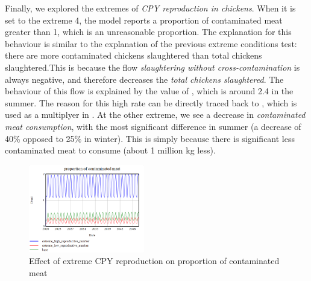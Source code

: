 Finally, we explored the extremes of \textit{CPY reproduction in chickens}. When it is set to the extreme 4, the model reports a proportion of contaminated meat greater than 1, which is an unreasonable proportion. The explanation for this behaviour is similar to the explanation of the previous extreme conditions test: there are more contaminated chickens slaughtered than total chickens slaughtered.This is because the flow \textit{slaughtering without cross-contamination} is always negative, and therefore decreases the \textit{total chickens slaughtered}. The behaviour of this flow is explained by the value of , which is around 2.4 in the summer. The reason for this high rate can be directly traced back to , which is used as a multiplyer in . At the other extreme, we see a decrease in \textit{contaminated meat consumption}, with the most significant difference in summer (a decrease of 40\% opposed to 25\% in winter). This is simply because there is significant less contaminated meat to consume (about 1 million kg less).

\begin{figure}[h!]
    \centering
    \includegraphics[width=0.45\textwidth]{images/extremes/CPY_reproduction_contaminated_meat.png} 
    \caption{Effect of extreme CPY reproduction on proportion of contaminated meat}
    \label{fig:reproduction_meat}
\end{figure}


